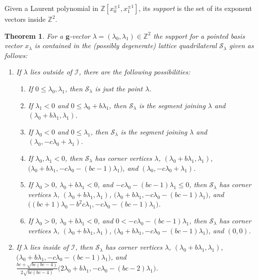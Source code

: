 \documentclass{amsart}
\newtheorem{theorem}{Theorem}
\numberwithin{theorem}{section}
\newcommand{\bfg}{\boldsymbol{g}}
\newcommand{\cI}{\mathcal{I}}
\newcommand{\cS}{\mathcal{S}}
\newcommand{\ZZ}{\mathbb{Z}}
\begin{document}
  Given a Laurent polynomial in $\ZZ[x_0^{\pm1},x_1^{\pm1}]$, its \emph{support} is the set of its exponent vectors inside $\ZZ^2$.
  \begin{theorem}
    \label{th:maximum support}
    For a $\bfg$-vector $\lambda=(\lambda_0,\lambda_1)\in\ZZ^2$ the support for a pointed basis vector $x_\lambda$ is contained in the (possibly degenerate) lattice quadrilateral $\cS_\lambda$ given as follows:
    \begin{enumerate}
      \item If $\lambda$ lies outside of $\cI$, there are the following possibilities:
        \begin{enumerate}
          \item If $0\le\lambda_0,\lambda_1$, then $\cS_\lambda$ is just the point $\lambda$.
          \item If $\lambda_1 < 0$ and $0\le\lambda_0+b\lambda_1$, then $\cS_\lambda$ is the segment joining $\lambda$ and $(\lambda_0+b\lambda_1,\lambda_1)$.
          \item If $\lambda_0 < 0$ and $0\le\lambda_1$, then $\cS_\lambda$ is the segment joining $\lambda$ and $(\lambda_0,-c\lambda_0+\lambda_1)$.
          \item If $\lambda_0,\lambda_1 < 0$, then $\cS_\lambda$ has corner vertices $\lambda$, $(\lambda_0+b\lambda_1,\lambda_1)$, $\big(\lambda_0+b\lambda_1,-c\lambda_0-(bc-1)\lambda_1\big)$, and $(\lambda_0,-c\lambda_0+\lambda_1)$.
          \item If $\lambda_0 > 0$, $\lambda_0+b\lambda_1 < 0$, and $-c\lambda_0-(bc-1)\lambda_1\le 0$, then $\cS_\lambda$ has corner vertices $\lambda$, $(\lambda_0+b\lambda_1,\lambda_1)$, $\big(\lambda_0+b\lambda_1,-c\lambda_0-(bc-1)\lambda_1\big)$, and $\big((bc+1)\lambda_0-b^2c\lambda_1,-c\lambda_0-(bc-1)\lambda_1\big)$.
          \item If $\lambda_0 > 0$, $\lambda_0+b\lambda_1 < 0$, and $0 < -c\lambda_0-(bc-1)\lambda_1$, then $\cS_\lambda$ has corner vertices $\lambda$, $(\lambda_0+b\lambda_1,\lambda_1)$, $\big(\lambda_0+b\lambda_1,-c\lambda_0-(bc-1)\lambda_1\big)$, and $(0,0)$.
        \end{enumerate}
      \item If $\lambda$ lies inside of $\cI$, then $\cS_\lambda$ has corner vertices $\lambda$, $(\lambda_0+b\lambda_1,\lambda_1)$, $\big(\lambda_0+b\lambda_1,-c\lambda_0-(bc-1)\lambda_1\big)$, and $\frac{bc+\sqrt{bc(bc-4)}}{2\sqrt{bc(bc-4)}}\big(2\lambda_0+b\lambda_1,-c\lambda_0-(bc-2)\lambda_1\big)$.
    \end{enumerate}
  \end{theorem}
\end{document}
